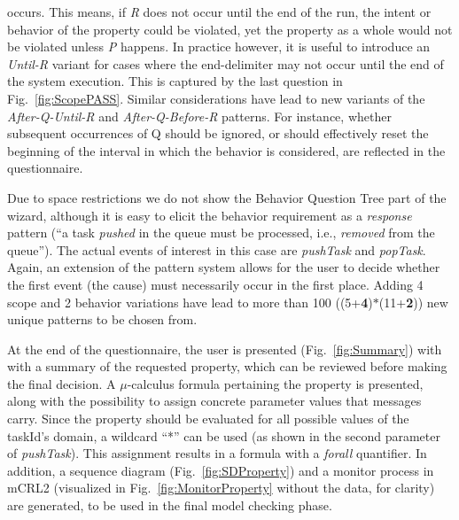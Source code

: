 \documentclass[letter]{llncs}
\begin{document}
occurs. This means, if \emph{R} does not occur until the end of the run, the intent or behavior 
of the property could be violated, yet the property as a whole would not be violated 
unless \emph{P} happens. In practice however, it is useful to introduce an \emph{Until-R} variant for cases where the end-delimiter may not occur until the end of 
the system execution. This is captured by the last question in Fig.~\ref{fig:ScopePASS}.
Similar considerations have lead to new variants of the \emph{After-Q-Until-R} and \emph{After-Q-Before-R} patterns.
For instance, whether subsequent occurrences of Q should be ignored, or should effectively reset the beginning of the interval
in which the behavior is considered, are reflected in the questionnaire.

Due to space restrictions we do not show the Behavior Question Tree part of the wizard, although it is easy to
elicit the behavior requirement as a \emph{response} pattern (``a task \emph{pushed} in the queue must be processed, i.e., \emph{removed} from the queue'').
The actual events of interest in this case are \emph{pushTask} and \emph{popTask}. Again, an extension of the pattern system allows
for the user to decide whether the first event (the cause) must necessarily occur in the first place. 
Adding 4 scope and 2 behavior variations have lead to more than 100 ((5+\textbf{4})$\ast$(11+\textbf{2})) new unique patterns to be chosen from. 

At the end of the questionnaire, the user is presented (Fig.~\ref{fig:Summary}) with with a summary of the requested property, which can be reviewed before making the final decision.
A $\mu$-calculus formula pertaining the property is presented, along with the possibility to assign concrete parameter values that messages carry. 
Since the property should be evaluated for all possible values of the taskId's domain, a wildcard ``*'' can be used (as shown in the second parameter of \emph{pushTask}).
This assignment results in a formula with a \emph{forall} quantifier. In addition, a sequence diagram (Fig.~\ref{fig:SDProperty}) and a monitor process in mCRL2 (visualized in Fig.~\ref{fig:MonitorProperty} without the data, for clarity)  
are generated, to be used in the final model checking phase.
\end{document}
